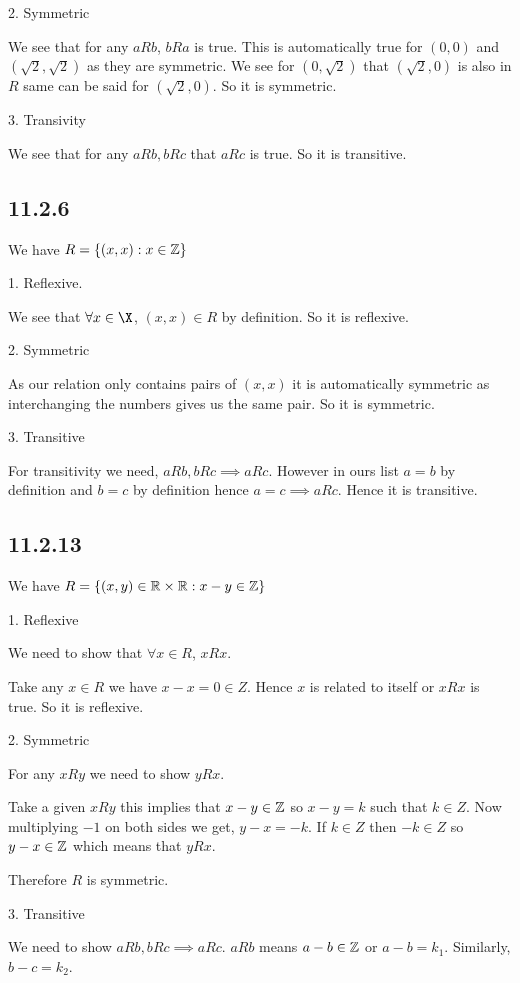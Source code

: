 \documentclass[a4paper]{report}
\begin{document}
2. Symmetric

We see that for any $aRb$, $bRa$ is true. This is automatically true for $(0,0)$ and $(\sqrt 2, \sqrt 2)$ as they are symmetric. We see for $(0,\sqrt 2)$ that $(\sqrt 2,0)$ is also in $R$ same can be said for $(\sqrt 2, 0)$. So it is symmetric.

3. Transivity

We see that for any $aRb, bRc$  that $aRc$ is true. So it is transitive. 


\subsection*{11.2.6}
We have $R = \{(x,x): x \in \mathbb{Z}\}$

1. Reflexive.

We see that  $\forall x \in \X$, $(x,x) \in R$ by definition. So it is reflexive.

2. Symmetric

As our relation only contains pairs of $(x,x)$ it is automatically symmetric as interchanging the numbers gives us the same pair. So it is symmetric.

3. Transitive

For transitivity we need, $aRb, bRc \implies aRc$. However in ours list $a = b$ by definition and $b = c$ by definition hence $a= c \implies aRc$. Hence it is transitive.

\subsection*{11.2.13}
We have $R = \{(x,y) \in \mathbb{R} \times  \mathbb{R} : x - y  \in \mathbb{Z}\}$

1. Reflexive

We need to show that $\forall x \in R$, $xRx$. 

Take any  $x \in R$ we have $x - x = 0 \in Z$. Hence $x$ is  related to itself or $xRx$ is true. So it is reflexive.

2. Symmetric

For any $xRy$ we need to show  $yRx$.

Take a given  $xRy$ this implies that $x - y \in \mathbb{Z}$ so  $x - y = k$ such that  $k \in Z$. Now multiplying  $-1$ on both sides we get, $y - x = -k$. If  $ k \in Z $ then $ -k \in Z$ so $y -x \in \mathbb{Z}$ which means that $yRx$.

Therefore  $R$ is symmetric.

3. Transitive

We need to show $aRb, bRc \implies aRc$. $aRb$ means $a - b \in \mathbb{Z}$ or $a - b = k_1$. Similarly, $b - c = k_2$.
\end{document}
